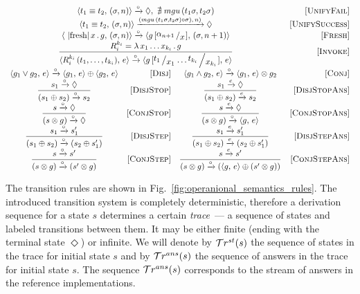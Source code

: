 \begin{figure*}[h]
  \renewcommand{\arraystretch}{1.6}
  \[
  \begin{array}{crcr}
    \multicolumn{3}{c}{\taskst{t_1 \equiv t_2}{(\sigma, n)} \xrightarrow{\circ} \Diamond , \, \, \nexists\; mgu\,(t_1 \sigma, t_2 \sigma)} &\ruleno{UnifyFail} \\
    \multicolumn{3}{c}{\taskst{t_1 \equiv t_2}{(\sigma, n)} \xrightarrow{(mgu\,(t_1 \sigma, t_2 \sigma) \circ \sigma),\, n)} \Diamond} & \ruleno{UnifySuccess} \\
    \multicolumn{3}{c}{\taskst{\mbox{\lstinline|fresh|}\, x\, .\, g}{(\sigma, n)} \xrightarrow{\circ} \taskst{g\,[\bigslant{\alpha_{n + 1}}{x}]}{( \sigma, n + 1)}} & \ruleno{Fresh} \\
    \multicolumn{3}{c}{\dfrac{R_i^{k_i}=\lambda\,x_1\dots x_{k_i}\,.\,g}{\taskst{R_i^{k_i}\,(t_1,\dots,t_{k_i})}{e} \xrightarrow{\circ} \taskst{g\,[\bigslant{t_1}{x_1}\dots\bigslant{t_{k_i}}{x_{k_i}}]}{e}}} & \ruleno{Invoke}\\[3mm]
    \taskst{g_1 \lor g_2}{e} \xrightarrow{\circ} \taskst{g_1}{e} \oplus \taskst{g_2}{e} & \ruleno{Disj} &
    \taskst{g_1 \land g_2}{e} \xrightarrow{\circ} \taskst{g_1}{e} \otimes g_2 & \ruleno{Conj} \\    
    \dfrac{s_1 \xrightarrow{\circ} \Diamond}{(s_1 \oplus s_2) \xrightarrow{\circ} s_2} & \ruleno{DisjStop} &
    \dfrac{s_1 \xrightarrow{e} \Diamond}{(s_1 \oplus s_2) \xrightarrow{e} s_2} & \ruleno{DisjStopAns}\\
    \dfrac{s \xrightarrow{\circ} \Diamond}{(s \otimes g) \xrightarrow{\circ} \Diamond} &\ruleno{ConjStop} &
    \dfrac{s \xrightarrow{e} \Diamond}{(s \otimes g) \xrightarrow{\circ} \taskst{g}{e}}  & \ruleno{ConjStopAns}\\
    \dfrac{s_1 \xrightarrow{\circ} s'_1}{(s_1 \oplus s_2) \xrightarrow{\circ} (s_2 \oplus s'_1)} &\ruleno{DisjStep} &
    \dfrac{s_1 \xrightarrow{e} s'_1}{(s_1 \oplus s_2) \xrightarrow{e} (s_2 \oplus s'_1)} &\ruleno{DisjStepAns}\\
    \dfrac{s \xrightarrow{\circ} s'}{(s \otimes g) \xrightarrow{\circ} (s' \otimes g)} &\ruleno{ConjStep} &
    \dfrac{s \xrightarrow{e} s'}{(s \otimes g) \xrightarrow{\circ} (\taskst{g}{e} \oplus (s' \otimes g))} & \ruleno{ConjStepAns} 
  \end{array}
  \]
  \caption{Operational semantics of interleaving search}
  \label{fig:operanional_semantics_rules}
\end{figure*}

The transition rules are shown in Fig.~\ref{fig:operanional_semantics_rules}. The introduced transition system is completely deterministic,
therefore a derivation sequence for a state $s$ determines a certain \emph{trace}~--- a sequence of states and labeled transitions between
them. It may be either finite (ending with the terminal state $\Diamond$) or infinite. We will denote by $\mathcal{T}r^{st}(s)$ the sequence of states in
the trace for initial state $s$ and by $\mathcal{T}r^{ans}(s)$ the sequence of answers in the trace for initial state $s$. The sequence $\mathcal{T}r^{ans}(s)$ corresponds
to the stream of answers in the reference \mK implementations.

